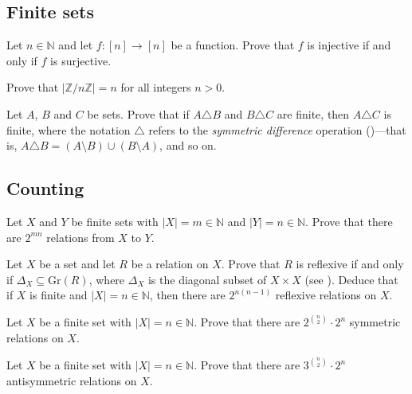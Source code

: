 \subsection*{Finite sets}

\begin{chapex}
Let $n \in \mathbb{N}$ and let $f : [n] \to [n]$ be a function. Prove that $f$ is injective if and only if $f$ is surjective.
\end{chapex}

\begin{chapex}
Prove that $|\mathbb{Z}/n\mathbb{Z}|=n$ for all integers $n > 0$.
\end{chapex}

\begin{chapex}
Let $A$, $B$ and $C$ be sets. Prove that if $A \triangle B$ and $B \triangle C$ are finite, then $A \triangle C$ is finite, where the notation $\triangle$ refers to the \textit{symmetric difference} operation ()---that is, $A \triangle B = (A \setminus B) \cup (B \setminus A)$, and so on.
\end{chapex}

\subsection*{Counting}

\begin{chapex}
Let $X$ and $Y$ be finite sets with $|X|=m \in \mathbb{N}$ and $|Y|=n \in \mathbb{N}$. Prove that there are $2^{mn}$ relations from $X$ to $Y$.
\end{chapex}

\begin{chapex}
Let $X$ be a set and let $R$ be a relation on $X$. Prove that $R$ is reflexive if and only if $\Delta_X \subseteq \mathrm{Gr}(R)$, where $\Delta_X$ is the diagonal subset of $X \times X$ (see ). Deduce that if $X$ is finite and $|X|=n \in \mathbb{N}$, then there are $2^{n(n-1)}$ reflexive relations on $X$.
\end{chapex}

\begin{chapex}
Let $X$ be a finite set with $|X|=n \in \mathbb{N}$. Prove that there are $2^{\binom{n}{2}} \cdot 2^n$ symmetric relations on $X$.
\end{chapex}

\begin{chapex}
Let $X$ be a finite set with $|X|=n \in \mathbb{N}$. Prove that there are $3^{\binom{n}{2}} \cdot 2^n$ antisymmetric relations on $X$.
\end{chapex}

